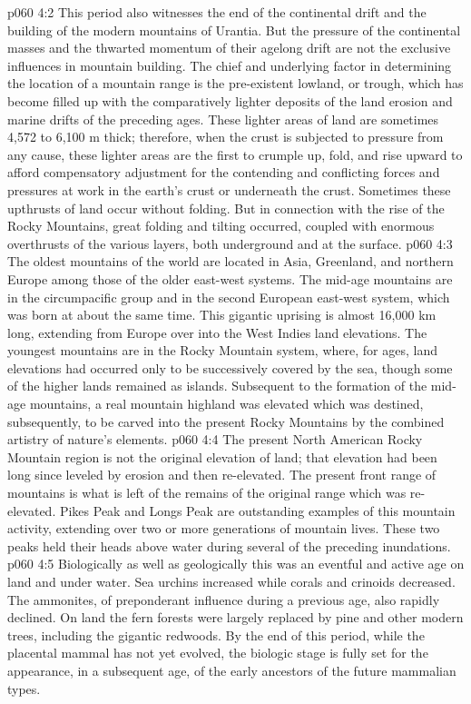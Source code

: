 \vs p060 4:2 This period also witnesses the end of the continental drift and the building of the modern mountains of Urantia. But the pressure of the continental masses and the thwarted momentum of their agelong drift are not the exclusive influences in mountain building. The chief and underlying factor in determining the location of a mountain range is the pre\hyp{}existent lowland, or trough, which has become filled up with the comparatively lighter deposits of the land erosion and marine drifts of the preceding ages. These lighter areas of land are sometimes 4,572 to 6,100 m thick; therefore, when the crust is subjected to pressure from any cause, these lighter areas are the first to crumple up, fold, and rise upward to afford compensatory adjustment for the contending and conflicting forces and pressures at work in the earth’s crust or underneath the crust. Sometimes these upthrusts of land occur without folding. But in connection with the rise of the Rocky Mountains, great folding and tilting occurred, coupled with enormous overthrusts of the various layers, both underground and at the surface.
\vs p060 4:3 \pc The oldest mountains of the world are located in Asia, Greenland, and northern Europe among those of the older east\hyp{}west systems. The mid\hyp{}age mountains are in the circumpacific group and in the second European east\hyp{}west system, which was born at about the same time. This gigantic uprising is almost 16,000 km long, extending from Europe over into the West Indies land elevations. The youngest mountains are in the Rocky Mountain system, where, for ages, land elevations had occurred only to be successively covered by the sea, though some of the higher lands remained as islands. Subsequent to the formation of the mid\hyp{}age mountains, a real mountain highland was elevated which was destined, subsequently, to be carved into the present Rocky Mountains by the combined artistry of nature’s elements.
\vs p060 4:4 The present North American Rocky Mountain region is not the original elevation of land; that elevation had been long since leveled by erosion and then re\hyp{}elevated. The present front range of mountains is what is left of the remains of the original range which was re\hyp{}elevated. Pikes Peak and Longs Peak are outstanding examples of this mountain activity, extending over two or more generations of mountain lives. These two peaks held their heads above water during several of the preceding inundations.
\vs p060 4:5 Biologically as well as geologically this was an eventful and active age on land and under water. Sea urchins increased while corals and crinoids decreased. The ammonites, of preponderant influence during a previous age, also rapidly declined. On land the fern forests were largely replaced by pine and other modern trees, including the gigantic redwoods. By the end of this period, while the placental mammal has not yet evolved, the biologic stage is fully set for the appearance, in a subsequent age, of the early ancestors of the future mammalian types.
